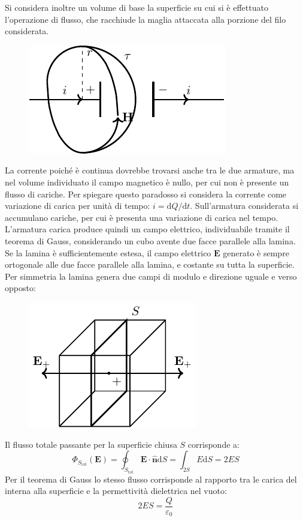 \documentclass{article}
\newcommand{\vect}[1]{\boldsymbol{\mathbf{#1}}}
\newcommand{\df}{\mathrm{d}}
\numberwithin{equation}{subsection}
\begin{document}
Si considera inoltre un volume di base la superficie su cui si è effettuato l'operazione di flusso, che racchiude la maglia attaccata alla porzione del filo considerata. 

\begin{figure}[H]%
    \centering
    \includegraphics{flusso-filo-reciso.pdf}%
    \label{fig:flusso-filo-reciso}
\end{figure}

La corrente poiché è continua dovrebbe trovarsi anche tra le due armature, ma nel volume individuato il campo magnetico è nullo, per cui non è presente un flusso di cariche. 
Per spiegare questo paradosso si considera la corrente come variazione di carica per unità di tempo: $i={\df Q}/{\df t}$. Sull'armatura considerata si accumulano 
cariche, per cui è presenta una variazione di carica nel tempo. L'armatura carica produce quindi un campo elettrico, individuabile tramite il teorema di Gauss, considerando un 
cubo avente due facce parallele alla lamina. Se la lamina è sufficientemente estesa, il campo elettrico $\vect{E}$ generato è sempre ortogonale alle due facce parallele 
alla lamina, e costante su tutta la superficie. Per simmetria la lamina genera due campi di modulo e direzione uguale e verso opposto:

\begin{figure}[H]%
    \centering
    \includegraphics{flusso-lamina.pdf}%
    \label{fig:flusso-lamina}
\end{figure}

Il flusso totale passante per la superficie chiusa $S$ corrisponde a:
\begin{equation*}
    \Phi_{S_\mathrm{tot}}(\vect{E})=\displaystyle\oint_{S_\mathrm{tot}}\vect{E}\cdot\hat{\vect{n}}\df S=\int_{2S}E\df S=2ES
\end{equation*}
Per il teorema di Gauss lo stesso flusso corrisponde al rapporto tra le carica del interna alla superficie e la permettività dielettrica nel vuoto:
\begin{equation*}
    2ES=\displaystyle\frac{Q}{\varepsilon_0}
\end{equation*}
\end{document}
